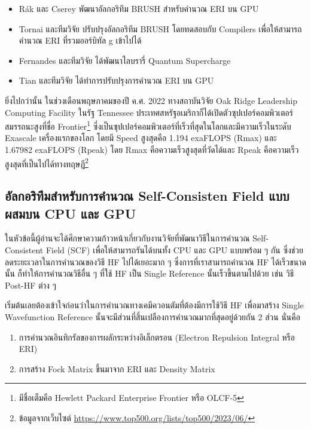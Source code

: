 \begin{itemize}[topsep=0pt,noitemsep]
  \item Rák และ Cserey พัฒนาอัลกอริทึม BRUSH สำหรับคำนวณ ERI บน GPU\autocite{rak2015}

  \item Tornai และทีมวิจัย ปรับปรุงอัลกอริทึม BRUSH โดยทดสอบกับ Compilers เพื่อให้สามารถคำนวณ ERI ที่รวมออร์บิทัล g เข้าไปได้\autocite{tornai2019}

  \item Fernandes และทีมวิจัย ได้พัฒนาไลบรารี่ Quantum Supercharge\autocite{fernandes2015}

  \item Tian และทีมวิจัย ได้ทำการปรับปรุงการคำนวณ ERI บน GPU\autocite{tian2021}
\end{itemize}

ยิ่งไปกว่านั้น ในช่วงเดือนพฤษภาคมของปี ค.ศ. 2022 ทางสถาบันวิจัย Oak Ridge Leadership Computing Facility ในรัฐ Tennessee ประเทศสหรัฐอเมริกาก็ได้เปิดตัวซุปเปอร์คอมพิวเตอร์สมรรถนะสูงที่ชื่อ Frontier\footnote{มีชื่อเต็มคือ Hewlett Packard Enterprise Frontier หรือ OLCF-5} ซึ่งเป็นซุปเปอร์คอมพิวเตอร์ที่เร็วที่สุดในโลกและมีความเร็วในระดับ Exascale เครื่องแรกของโลก โดยมี Speed สูงสุดคือ 1.194
exaFLOPS (Rmax) และ 1.67982 exaFLOPS (Rpeak) โดย Rmax คือความเร็วสูงสุดที่วัดได้และ Rpeak คือความเร็วสูงสุดที่เป็นไปได้ทางทฤษฎี\footnote{ข้อมูลจากเว็บไซต์ \url{https://www.top500.org/lists/top500/2023/06/}}

\subsection{อัลกอริทึมสำหรับการคำนวณ Self-Consisten Field แบบผสมบน CPU และ GPU}

ในหัวข้อนี้ผู้อ่านจะได้ศึกษาความก้าวหน้าเกี่ยวกับงานวิจัยที่พัฒนาวิธีในการคำนวณ Self-Consistent Field (SCF) เพื่อให้สามารถรันได้บนทั้ง CPU และ GPU แบบพร้อม ๆ กัน ซึ่งช่วยลดระยะเวลาในการคำนวณของวิธี HF ไปได้เยอะมาก ๆ ซึ่งการที่เราสามารถคำนวณ HF ได้เร็วขนาดนั้น ก็ทำให้การคำนวณวิธีอื่น ๆ ที่ใช้ HF เป็น Single Reference นั้นเร็วขึ้นตามไปด้วย เช่น วิธี Post-HF ต่าง ๆ

เริ่มต้นเลยต้องเข้าใจก่อนว่าในการคำนวณทางเคมีควอนตัมที่ต้องมีการใช้วิธี HF เพื่อมาสร้าง Single Wavefunction Reference นั้นจะมีส่วนที่สิ้นเปลืองการคำนวณมากที่สุดอยู่ด้วยกัน 2 ส่วน นั่นคือ
%
\begin{enumerate}[topsep=0pt,noitemsep]
  \setlength\itemsep{0.5em}
  \item การคำนวณอินทิกรัลของการผลักระหว่างอิเล็กตรอน (Electron Repulsion Integral หรือ ERI)

  \item การสร้าง Fock Matrix ขึ้นมาจาก ERI และ Density Matrix
\end{enumerate}

